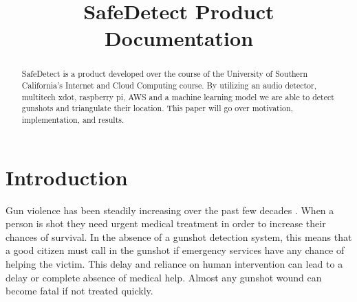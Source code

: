 \documentclass[conference]{IEEEtran}
\begin{document}
\title{SafeDetect Product Documentation\\
}

\author{
\and
{}
\and
{}
\and
{}

}

\maketitle

\begin{abstract}
SafeDetect is a product developed over the course of the University of Southern California's Internet and Cloud Computing course. By utilizing an audio detector, multitech xdot, raspberry pi, AWS and a machine learning model we are able to detect gunshots and triangulate their location. This paper will go over motivation, implementation, and results.
\end{abstract}


\section{Introduction}
Gun violence has been steadily increasing over the past few decades \cite{b1}. When a person is shot they need urgent medical treatment in order to increase their chances of survival. In the absence of a gunshot detection system, this means that a good citizen must call in the gunshot if emergency services have any chance of helping the victim. This delay and reliance on human intervention can lead to a delay or complete absence of medical help. Almost any gunshot wound can become fatal if not treated quickly. 
\end{document}
